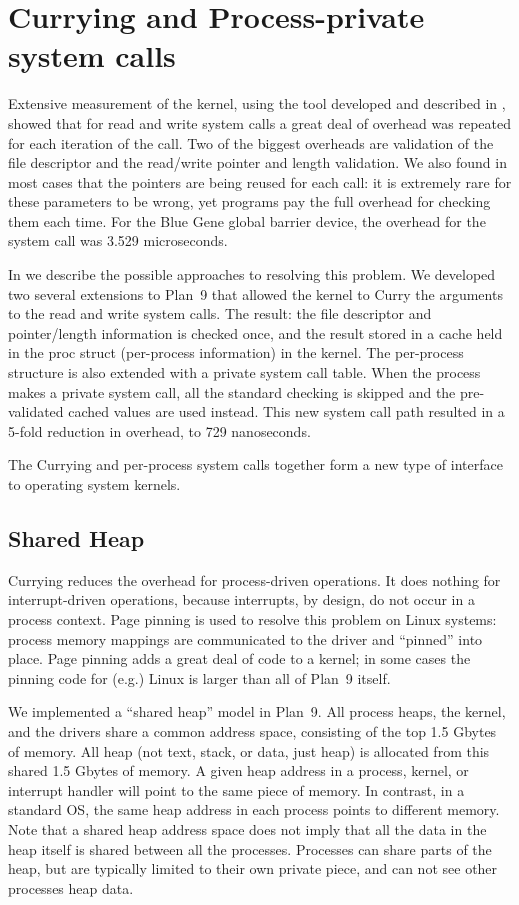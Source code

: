 \section{Currying and Process-private system calls}
Extensive measurement of the kernel, using the tool developed and described in \cite{plan9trace}, showed
that for read and write system calls a great deal of overhead was repeated for each iteration of the 
call. Two of the biggest overheads are validation of the file descriptor and the read/write pointer and 
length validation. We also found in most cases that the pointers are being reused for each call: it is extremely rare for these parameters to be wrong, yet programs pay the full overhead for checking them 
each time. For the Blue Gene global barrier device, the overhead for the system call was 3.529 microseconds. 

In \cite{currying} we describe the possible approaches to resolving this problem. We developed two 
several extensions to Plan~9 that allowed the kernel to Curry the arguments to the read and write
system calls. The result: the file descriptor and pointer/length information is checked once, and the
result stored in a cache held in the proc struct (per-process information) in the kernel. The per-process structure is 
also extended with a private system call table. When the process makes a private system
call, all the standard checking is skipped and the pre-validated cached values are used instead. This 
new system call path resulted in a 5-fold reduction in overhead, to 729 nanoseconds. 

The Currying and per-process system calls together form a new type of interface to operating system
kernels. 

\subsection{Shared Heap}
Currying reduces the overhead for process-driven operations. It does nothing for interrupt-driven
operations, because interrupts, by design, do not occur in a process context. Page pinning is used 
to resolve this problem on Linux systems: process memory mappings are communicated to the driver
and ``pinned'' into place. Page pinning adds a great deal of code to a kernel; in some cases the
pinning code for (e.g.) Linux is larger than all of Plan~9 itself. 

We implemented a ``shared heap'' model in Plan~9. All process heaps, the kernel, and the drivers 
share a common address space, consisting of the top 1.5 Gbytes of memory. All heap (not text, stack,
or data, 
just heap) is allocated from this shared 1.5 Gbytes of memory. 
A given heap address in a process, kernel, or interrupt handler will
point to the same piece of memory. In contrast, in a standard OS, the same heap address in each 
process points to different memory. Note that a shared heap address space does not imply that 
all the data in the heap itself is shared between all the processes.  
Processes can share parts of the heap, but are typically limited to their own private piece, and 
can not see other processes heap data. 


